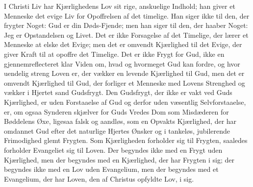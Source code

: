 \documentclass[12pt]{book}
\begin{document}
I Christi Liv har Kjærlighedens Lov sit rige, anskuelige Indhold;
han giver et Menneske det evige Liv for Opoffrelsen af det timelige.
Han siger ikke til den, der frygter Noget: Gud er din Døds-Fjende;
men han siger til den, der haaber Noget: Jeg er Opstandelsen og
Livet. Det er ikke Forsagelse af det Timelige, der lærer et Menneske
at elske det Evige; men det er omvendt Kjærlighed til det Evige, der
giver Kraft til at opoffre det Timelige. Det er ikke Frygt for Gud,
ikke en gjennemreflecteret klar Viden om, hvad og hvormeget Gud kan
fordre, og hvor uendelig streng Loven er, der vækker en levende
Kjærlighed til Gud, men det er omvendt Kjærlighed til Gud, der
forliger et Menneske med Lovens Strenghed og vækker i Hjertet sand
Gudsfrygt. Den Gudsfrygt, der ikke er vakt ved Guds Kjærlighed, er
uden Forstaaelse af Gud og derfor uden væsentlig Selvforstaaelse,
er, om ogsaa Synderen skjælver for Guds Vredes Dom som Misdæderen
for Bøddelens Øxe, ligesaa falsk og aandløs, som en Opvakts
Kjærlighed, der har omdannet Gud efter det naturlige Hjertes Ønsker
og i tankeløs, jubilerende Frimodighed glemt Frygten. Som
Kjærligheden forholder sig til Frygten, saaledes forholder
Evangeliet sig til Loven. Der begyndes ikke med en Frygt uden
Kjærlighed, men der begyndes med en Kjærlighed, der har Frygten i
sig; der begyndes ikke med en Lov uden Evangelium, men der begyndes
med et Evangelium, der har Loven, den af Christus opfyldte Lov, i
sig.
\end{document}
